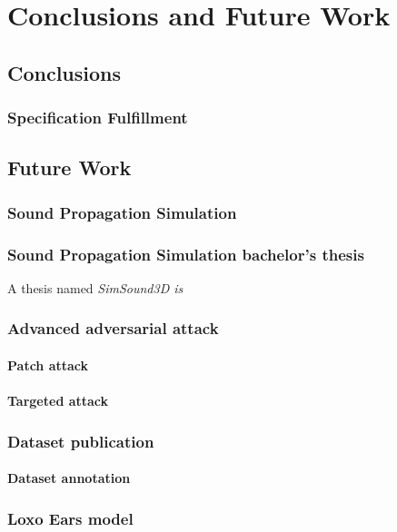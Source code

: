 \chapter{Conclusions and Future Work}
\label{ch:conclusions}

\section{Conclusions}

\subsection{Specification Fulfillment}

\section{Future Work}

\subsection{Sound Propagation Simulation}

\subsection{Sound Propagation Simulation bachelor's thesis}
A thesis named \it{SimSound3D} is 

\subsection{Advanced adversarial attack}

\subsubsection{Patch attack}

\subsubsection{Targeted attack}

\subsection{Dataset publication}

\subsubsection{Dataset annotation}

\subsection{Loxo Ears model}









